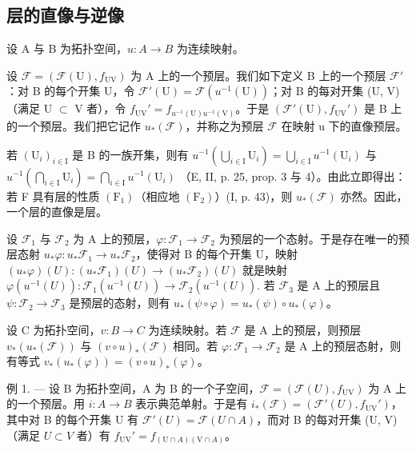 \subsection{层的直像与逆像}

设 A 与 B 为拓扑空间，\(u: A \rightarrow B\) 为连续映射。

设 \(\mathcal{F} = (\mathcal{F}(\mathrm{U}), f_{\mathrm{UV}})\) 为 A 上的一个预层。我们如下定义 B 上的一个预层 \(\mathcal{F}'\)：对 B 的每个开集 U，令 \(\mathcal{F}'(\mathrm{U}) = \mathcal{F}(u^{-1}(\mathrm{U}))\)；对 B 的每对开集 (U, V) （满足 U \(\subset\) V 者），令 \(f_{\mathrm{UV}}' = f_{u^{-1}(\mathrm{U})u^{-1}(\mathrm{V})}\)。于是 \((\mathcal{F}'(\mathrm{U}), f_{\mathrm{UV}}')\) 是 B 上的一个预层。我们把它记作 \(u_{*}(\mathcal{F})\)，并称之为预层 \(\mathcal{F}\) 在映射 u 下的直像预层。

若 \((\mathrm{U}_{i})_{i\in\mathrm{I}}\) 是 B 的一族开集，则有 \(u^{-1}(\bigcup_{i\in\mathrm{I}}\mathrm{U}_{i})=\bigcup_{i\in\mathrm{I}}u^{-1}(\mathrm{U}_{i})\) 与 \(u^{-1}(\bigcap_{i\in\mathrm{I}}\mathrm{U}_{i})=\bigcap_{i\in\mathrm{I}}u^{-1}(\mathrm{U}_{i})\) （E, II, p. 25, prop. 3 与 4）。由此立即得出：若 F 具有层的性质 \((\mathrm{F}_{1})\)（相应地 \((\mathrm{F}_{2})\)）(I, p. 43)，则 \(u_{*}(\mathcal{F})\) 亦然。因此，一个层的直像是层。

设 \(\mathcal{F}_1\) 与 \(\mathcal{F}_2\) 为 A 上的预层，\(\varphi\colon\mathcal{F}_1\to\mathcal{F}_2\) 为预层的一个态射。于是存在唯一的预层态射 \(u_*\varphi\colon u_*\mathcal{F}_1\to u_*\mathcal{F}_2\)，使得对 B 的每个开集 U，映射 \((u_*\varphi)(U)\colon(u_*\mathcal{F}_1)(U)\to(u_*\mathcal{F}_2)(U)\) 就是映射 \(\varphi(u^{-1}(U))\colon\mathcal{F}_{1}(u^{-1}(U))\to\mathcal{F}_{2}(u^{-1}(U)).\) 若 \(\mathcal{F}_{3}\) 是 A 上的预层且 \(\psi\colon\mathcal{F}_{2}\to\mathcal{F}_{3}\) 是预层的态射，则有 \(u_{*}(\psi\circ\varphi)=u_{*}(\psi)\circ u_{*}(\varphi)\)。

设 C 为拓扑空间，\(v: B \to C\) 为连续映射。若 \(\mathcal{F}\) 是 A 上的预层，则预层 \(v_{*}(u_{*}(\mathcal{F}))\) 与 \((v \circ u)_{*}(\mathcal{F})\) 相同。若 \(\varphi: \mathcal{F}_{1} \to \mathcal{F}_{2}\) 是 A 上的预层态射，则有等式 \(v_{*}(u_{*}(\varphi)) = (v \circ u)_{*}(\varphi)\)。

例 1. --- 设 B 为拓扑空间，A 为 B 的一个子空间，\(\mathcal{F} = (\mathcal{F}(U), f_{\mathrm{UV}})\) 为 A 上的一个预层。用 \(i: A \to B\) 表示典范单射。于是有 \(i_*(\mathcal{F}) = (\mathcal{F}'(U), f_{\mathrm{UV}}')\)，其中对 B 的每个开集 U 有 \(\mathcal{F}'(U) = \mathcal{F}(U \cap A)\)，而对 B 的每对开集 (U, V) （满足 \(U \subset V\) 者）有 \(f_{\mathrm{UV}}' = f_{(\mathrm{U} \cap A)(\mathrm{V} \cap A)}\)。

